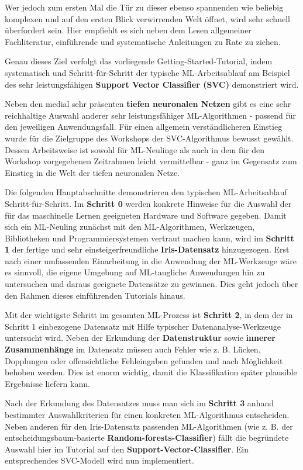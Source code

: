 \documentclass [oneside,10pt,a4paper,ngerman,BCOR10mm,headsepline,parindent,final]{scrartcl}
\begin{document}
Wer jedoch zum ersten Mal die Tür zu dieser ebenso spannenden wie
beliebig komplexen und auf den ersten Blick verwirrenden Welt öffnet,
wird sehr schnell überfordert sein. Hier empfiehlt es sich neben dem
Lesen allgemeiner Fachliteratur, einführende und systematische
Anleitungen zu Rate zu ziehen.

Genau dieses Ziel verfolgt das vorliegende Getting-Started-Tutorial,
indem systematisch und Schritt-für-Schritt der typische ML-Arbeitsablauf
am Beispiel des sehr leistungsfähigen \textbf{Support Vector Classifier
(SVC)} demonstriert wird.

Neben den medial sehr präsenten \textbf{tiefen neuronalen Netzen} gibt
es eine sehr reichhaltige Auswahl anderer sehr leistungsfähiger
ML-Algorithmen - passend für den jeweiligen Anwendungsfall. Für einen
allgemein verständlicheren Einstieg wurde für die Zielgruppe des
Workshops der SVC-Algorithmus bewusst gewählt. Dessen Arbeitsweise ist
sowohl für ML-Neulinge als auch in dem für den Workshop vorgegebenen
Zeitrahmen leicht vermittelbar - ganz im Gegensatz zum Einstieg in die
Welt der tiefen neuronalen Netze.

Die folgenden Hauptabschnitte demonstrieren den typischen
ML-Arbeitsablauf Schritt-für-Schritt. Im \textbf{Schritt 0} werden
konkrete Hinweise für die Auswahl der für das maschinelle Lernen
geeigneten Hardware und Software gegeben. Damit sich ein ML-Neuling
zunächst mit den ML-Algorithmen, Werkzeugen, Bibliotheken und
Programmiersystemen vertraut machen kann, wird im \textbf{Schritt 1} der
fertige und sehr einsteigerfreundliche \textbf{Iris-Datensatz}
hinzugezogen. Erst nach einer umfassenden Einarbeitung in die Anwendung
der ML-Werkzeuge wäre es sinnvoll, die eigene Umgebung auf ML-taugliche
Anwendungen hin zu untersuchen und daraus geeignete Datensätze zu
gewinnen. Dies geht jedoch über den Rahmen dieses einführenden Tutorials
hinaus.

Mit der wichtigste Schritt im gesamten ML-Prozess ist \textbf{Schritt
2}, in dem der in Schritt 1 einbezogene Datensatz mit Hilfe typischer
Datenanalyse-Werkzeuge untersucht wird. Neben der Erkundung der
\textbf{Datenstruktur} sowie \textbf{innerer Zusammenhänge} im Datensatz
müssen auch Fehler wie z. B. Lücken, Dopplungen oder offensichtliche
Fehleingaben gefunden und nach Möglichkeit behoben werden. Dies ist
enorm wichtig, damit die Klassifikation später plausible Ergebnisse
liefern kann.

Nach der Erkundung des Datensatzes muss man sich im \textbf{Schritt 3}
anhand bestimmter Auswahlkriterien für einen konkreten ML-Algorithmus
entscheiden. Neben anderen für den Iris-Datensatz passenden
ML-Algorithmen (wie z. B. der entscheidungsbaum-basierte
\textbf{Random-forests-Classifier}) fällt die begründete Auswahl hier im
Tutorial auf den \textbf{Support-Vector-Classifier}. Ein entsprechendes
SVC-Modell wird nun implementiert.
\end{document}
